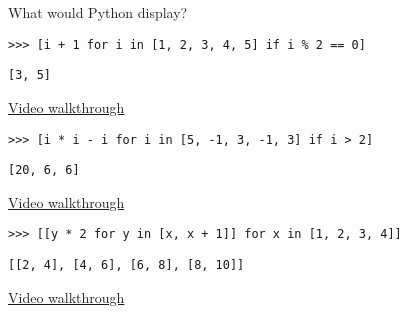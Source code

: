 \question What would Python display?

\begin{lstlisting}
>>> [i + 1 for i in [1, 2, 3, 4, 5] if i % 2 == 0]
\end{lstlisting}
\begin{solution}[1in]
\begin{lstlisting}
[3, 5]
\end{lstlisting}
\href{https://youtu.be/zP4jWZpwACM?t=31m}{Video walkthrough}
\end{solution}

\begin{lstlisting}
>>> [i * i - i for i in [5, -1, 3, -1, 3] if i > 2]
\end{lstlisting}
\begin{solution}[1in]
\begin{lstlisting}
[20, 6, 6]
\end{lstlisting}
\href{https://youtu.be/zP4jWZpwACM?t=35m28s}{Video walkthrough}
\end{solution}

\begin{lstlisting}
>>> [[y * 2 for y in [x, x + 1]] for x in [1, 2, 3, 4]]
\end{lstlisting}
\begin{solution}
\begin{lstlisting}
[[2, 4], [4, 6], [6, 8], [8, 10]]
\end{lstlisting}
\href{https://youtu.be/zP4jWZpwACM?t=36m05s}{Video walkthrough}
\end{solution}
